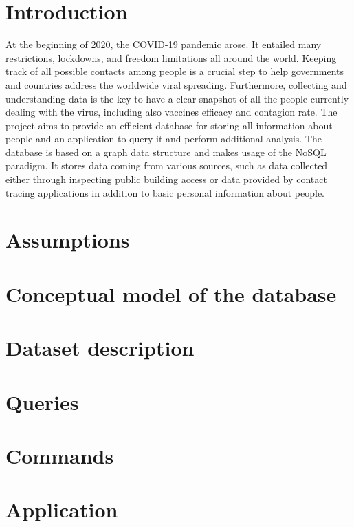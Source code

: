 \documentclass[a4paper, 12p]{article}
\begin{document}
\newpage

\setcounter{page}{1}
\section{Introduction}
At the beginning of 2020, the COVID-19 pandemic arose. It entailed many restrictions, lockdowns, and freedom limitations all around the world.
Keeping track of all possible contacts among people is a crucial step to help governments and countries address the worldwide viral spreading.
Furthermore, collecting and understanding data is the key to have a clear snapshot of all the people currently dealing with the virus, including also vaccines efficacy and contagion rate.
The project aims to provide an efficient database for storing all information about people and an application to query it and perform additional analysis.
The database is based on a graph data structure and makes usage of the NoSQL paradigm.
It stores data coming from various sources, such as data collected either through inspecting public building access or data provided by contact tracing applications in addition to basic personal information about people.

\section{Assumptions}


\newpage
\section{Conceptual model of the database}

\newpage
\section{Dataset description}


\section{Queries}


\newpage
\section{Commands}

\section{Application}

\end{document}

